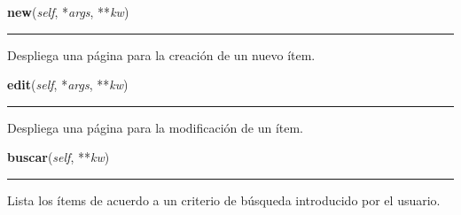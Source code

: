     \vspace{0.5ex}

\hspace{.8\funcindent}\begin{boxedminipage}{\funcwidth}

    \raggedright \textbf{new}(\textit{self}, *\textit{args}, **\textit{kw})

    \vspace{-1.5ex}

    \rule{\textwidth}{0.5\fboxrule}
\setlength{\parskip}{2ex}
    Despliega una página para la creación de un nuevo ítem.

\setlength{\parskip}{1ex}
    \end{boxedminipage}

    \label{saip:controllers:item_controller:ItemController:edit}

    \vspace{0.5ex}

\hspace{.8\funcindent}\begin{boxedminipage}{\funcwidth}

    \raggedright \textbf{edit}(\textit{self}, *\textit{args}, **\textit{kw})

    \vspace{-1.5ex}

    \rule{\textwidth}{0.5\fboxrule}
\setlength{\parskip}{2ex}
    Despliega una página para la modificación de un ítem.

\setlength{\parskip}{1ex}
    \end{boxedminipage}

    \label{saip:controllers:item_controller:ItemController:buscar}

    \vspace{0.5ex}

\hspace{.8\funcindent}\begin{boxedminipage}{\funcwidth}

    \raggedright \textbf{buscar}(\textit{self}, **\textit{kw})

    \vspace{-1.5ex}

    \rule{\textwidth}{0.5\fboxrule}
\setlength{\parskip}{2ex}
    Lista los ítems de acuerdo a un criterio de búsqueda introducido por el
    usuario.

\setlength{\parskip}{1ex}
    \end{boxedminipage}

